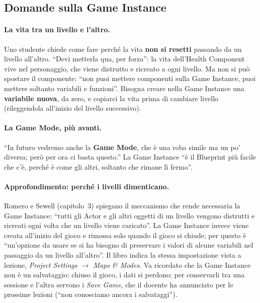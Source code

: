 \subsection{Domande sulla Game Instance}

\paragraph{La vita tra un livello e l'altro.} Uno studente chiede come fare
perché la vita \textbf{non si resetti} passando da un livello all'altro. ``Devi
metterla qua, per forza'': la vita dell'Health Component vive nel personaggio,
che viene distrutto e ricreato a ogni livello. Ma non si può spostare il
componente: ``non puoi mettere componenti sulla Game Instance, puoi mettere
soltanto variabili e funzioni''. Bisogna creare nella Game Instance una
\textbf{variabile nuova}, da zero, e copiarci la vita prima di cambiare livello
(rileggendola all'inizio del livello successivo).

\paragraph{La Game Mode, più avanti.} ``In futuro vedremo anche la
\textbf{Game Mode}, che è una roba simile ma un po' diversa; però per ora ci
basta questo.'' La Game Instance ``è il Blueprint più facile che c'è, perché è
come gli altri, soltanto che rimane lì fermo''.

\paragraph{Approfondimento: perché i livelli dimenticano.} Romero e Sewell
(capitolo~3) spiegano il meccanismo che rende necessaria la Game Instance:
``tutti gli Actor e gli altri oggetti di un livello vengono distrutti e ricreati
ogni volta che un livello viene caricato''. La Game Instance invece viene creata
all'inizio del gioco e rimossa solo quando il gioco si chiude; per questo è ``un'opzione da usare se si ha bisogno di preservare i valori di alcune variabili nel
passaggio da un livello all'altro''. Il libro indica la stessa impostazione vista
a lezione, \emph{Project Settings $\rightarrow$ Maps \& Modes}. Va ricordato che
la Game Instance non è un salvataggio: chiuso il gioco, i dati si perdono; per
conservarli tra una sessione e l'altra servono i \emph{Save Game}, che il
docente ha annunciato per le prossime lezioni (``non conosciamo ancora i
salvataggi'').

